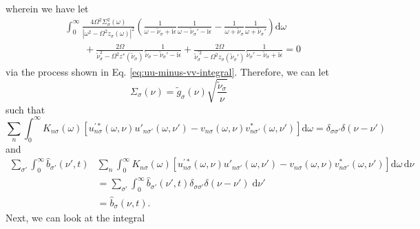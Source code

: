 wherein we have let
\begin{equation}
\begin{split}
&\int_0^\infty\frac{4\Omega^2\Sigma_\sigma^2(\omega)}{|\omega^2 - \Omega^2z_\sigma(\omega)|^2}\left(\frac{1}{\omega - \tilde{\nu}_\sigma + \mathrm{i}\epsilon}\frac{1}{\omega - \tilde{\nu}_{\sigma}' - \mathrm{i}\epsilon} - \frac{1}{\omega + \tilde{\nu}_\sigma}\frac{1}{\omega + \tilde{\nu}_\sigma'}\right)\mathrm{d}\omega\\
&\qquad + \frac{2\Omega}{\tilde{\nu}_\sigma^2 - \Omega^2z^*(\tilde{\nu}_\sigma)}\frac{1}{\tilde{\nu}_\sigma - \tilde{\nu}_\sigma' - \mathrm{i}\epsilon} + \frac{2\Omega}{\tilde{\nu}_\sigma^{\prime2} - \Omega^2z_\sigma(\tilde{\nu}_\sigma')}\frac{1}{\tilde{\nu}_\sigma' - \tilde{\nu}_\sigma + \mathrm{i}\epsilon} = 0
\end{split}
\end{equation}
via the process shown in Eq. \eqref{eq:uu-minus-vv-integral}. Therefore, we can let 
\begin{equation}
\Sigma_\sigma(\nu) = \tilde{g}_\sigma(\nu)\sqrt{\frac{\tilde{\nu}_\sigma}{\nu}}
\end{equation}
such that
\begin{equation}
\sum_n\int_0^\infty K_{n\sigma}(\omega)\left[u_{n\sigma}^{\prime*}(\omega,\nu)u'_{n\sigma'}(\omega,\nu') - v_{n\sigma}(\omega,\nu)v_{n\sigma'}^*(\omega,\nu')\right]\mathrm{d}\omega = \delta_{\sigma\sigma'}\delta(\nu - \nu')
\end{equation}
and
\begin{equation}
\begin{split}
\sum_{\sigma'}\int_0^\infty\hat{b}_{\sigma'}(\nu',t)&\sum_n\int_0^\infty K_{n\sigma}(\omega)\left[u_{n\sigma}^{\prime*}(\omega,\nu)u'_{n\sigma'}(\omega,\nu') - v_{n\sigma}(\omega,\nu)v_{n\sigma'}^*(\omega,\nu')\right]\mathrm{d}\omega\,\mathrm{d}\nu\\
&= \sum_{\sigma'}\int_0^\infty\hat{b}_{\sigma'}(\nu',t)\delta_{\sigma\sigma'}\delta(\nu - \nu')\;\mathrm{d}\nu'\\
&= \hat{b}_\sigma(\nu,t).
\end{split}
\end{equation}
Next, we can look at the integral
